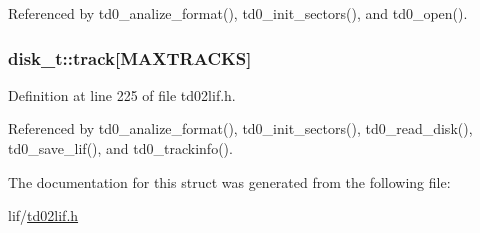 Referenced by td0\+\_\+analize\+\_\+format(), td0\+\_\+init\+\_\+sectors(), and td0\+\_\+open().

\subsubsection[{\texorpdfstring{track}{track}}]{ disk\+\_\+t\+::track\mbox{[}{\bf M\+A\+X\+T\+R\+A\+C\+KS}\mbox{]}}\hypertarget{structdisk__t_a6498dff29cc11a772be6e0cabb54520f}{}\label{structdisk__t_a6498dff29cc11a772be6e0cabb54520f}


Definition at line 225 of file td02lif.\+h.



Referenced by td0\+\_\+analize\+\_\+format(), td0\+\_\+init\+\_\+sectors(), td0\+\_\+read\+\_\+disk(), td0\+\_\+save\+\_\+lif(), and td0\+\_\+trackinfo().



The documentation for this struct was generated from the following file\+:\begin{DoxyCompactItemize}
\item 
lif/\hyperlink{td02lif_8h}{td02lif.\+h}\end{DoxyCompactItemize}
